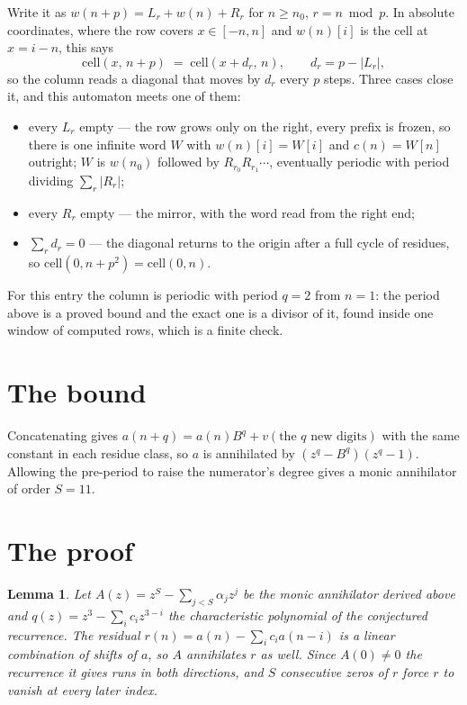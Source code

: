 \documentclass[11pt,a4paper]{article}
\theoremstyle{plain}
\newtheorem{lemma}[theorem]{Lemma}
\theoremstyle{definition}
\begin{document}
Write it as $w(n+p)=L_r+w(n)+R_r$ for $n\ge n_0$, $r=n \bmod p$. In absolute coordinates, where
the row covers $x\in[-n,n]$ and $w(n)[i]$ is the cell at $x=i-n$, this says
\[
\mathrm{cell}(x,\,n+p)\;=\;\mathrm{cell}(x+d_r,\,n),\qquad d_r=p-|L_r| ,
\]
so the column reads a diagonal that moves by $d_r$ every $p$ steps. Three cases close it, and
this automaton meets one of them:

\begin{itemize}
\item every $L_r$ empty --- the row grows only on the right, every prefix is frozen, so there
is one infinite word $W$ with $w(n)[i]=W[i]$ and $c(n)=W[n]$ outright; $W$ is $w(n_0)$ followed
by $R_{r_0}R_{r_1}\cdots$, eventually periodic with period dividing $\sum_r|R_r|$;
\item every $R_r$ empty --- the mirror, with the word read from the right end;
\item $\sum_r d_r=0$ --- the diagonal returns to the origin after a full cycle of residues, so
$\mathrm{cell}(0,n+p^2)=\mathrm{cell}(0,n)$.
\end{itemize}

For this entry the column is periodic with period $q=2$ from $n=1$: the period above is a
proved bound and the exact one is a divisor of it, found inside one window of computed rows,
which is a finite check.

\section{The bound}

Concatenating gives $a(n+q)=a(n)B^{q}+v(\text{the }q\text{ new digits})$ with the same constant in each residue class, so $a$ is annihilated by $(z^{q}-B^{q})(z^{q}-1)$.
Allowing the pre-period to raise the numerator's degree gives a monic annihilator of order
$S=11$.

\section{The proof}

\begin{lemma}\label{lem:crit}
Let $A(z)=z^S-\sum_{j<S}\alpha_jz^{j}$ be the monic annihilator derived above and
$q(z)=z^{3}-\sum_ic_iz^{3-i}$ the characteristic polynomial of the conjectured
recurrence. The residual $r(n)=a(n)-\sum_ic_ia(n-i)$ is a linear combination of shifts of $a$,
so $A$ annihilates $r$ as well. Since $A(0)\ne0$ the recurrence it gives runs in both
directions, and $S$ consecutive zeros of $r$ force $r$ to vanish at every later index.
\end{lemma}
\end{document}
